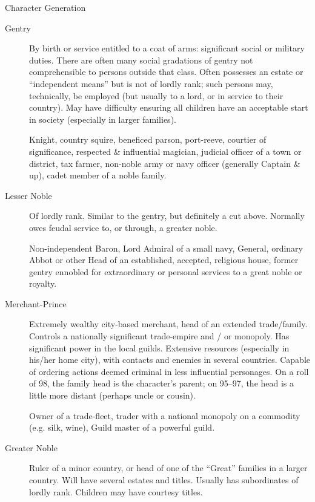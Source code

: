 \begin{Chapter}{Character Generation}
\begin{description}
\item[Gentry] By birth or service entitled to a coat of arms:
  significant social or military duties.  There are often many social
  gradations of gentry not comprehensible to persons outside that
  class.  Often possesses an estate or “independent means” but is not
  of lordly rank; such persons may, technically, be employed (but
  usually to a lord, or in service to their country).  May have
  difficulty ensuring all children have an acceptable start in society
  (especially in larger families).

  \begin{example}
    Knight, country squire, beneficed parson, port-reeve, courtier of
    significance, respected \& influential magician, judicial officer
    of a town or district, tax farmer, non-noble army or navy officer
    (generally Captain \& up), cadet member of a noble family.
  \end{example}

\item[Lesser Noble] Of lordly rank. Similar to the gentry, but
  definitely a cut above.  Normally owes feudal service to, or
  through, a greater noble.

  \begin{example}
    Non-independent Baron, Lord Admiral of a small navy, General,
    ordinary Abbot or other Head of an established, accepted,
    religious house, former gentry ennobled for extraordinary or
    personal services to a great noble or royalty.
  \end{example}
  
\item[Merchant-Prince] Extremely wealthy city-based merchant, head of
  an extended trade/family.  Controls a nationally significant
  trade-empire and / or monopoly.  Has significant power in the local
  guilds.  Extensive resources (especially in his/her home city), with
  contacts and enemies in several countries.  Capable of ordering
  actions deemed criminal in less influential personages. On a roll of
  98, the family head is the character’s parent; on 95--97, the head
  is a little more distant (perhaps uncle or cousin).

  \begin{example}
    Owner of a trade-fleet, trader with a national monopoly on a
    commodity (e.g.  silk, wine), Guild master of a powerful guild.
  \end{example}

\item[Greater Noble] Ruler of a minor country, or head of one of the
  “Great” families in a larger country.  Will have several estates and
  titles.  Usually has subordinates of lordly rank.  Children may have
  courtesy titles.


\end{description}
\end{Chapter}
